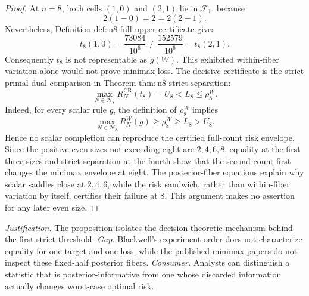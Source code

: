 \documentclass{article}
\begin{document}
\begin{proof}
At \(n=8\), both cells \((1,0)\) and \((2,1)\) lie in \(\mathcal F_1\), because
\[
 2(1-0)=2=2(2-1).
\]
Nevertheless, Definition
\(\mathrm{def{:}n8\mbox{-}full\mbox{-}upper\mbox{-}certificate}\)
gives
\[
 t_8(1,0)=\frac{73084}{10^6}
 \neq
 \frac{152579}{10^6}=t_8(2,1).
\]
Consequently \(t_8\) is not representable as \(g(W)\).  This exhibited within-fiber variation alone would not prove minimax loss.  The decisive certificate is the strict primal-dual comparison in Theorem
\(\mathrm{thm{:}n8\mbox{-}strict\mbox{-}separation}\):
\[
 \max_{N\in\mathcal N_8}R_N^{\mathrm{CR}}(t_8)
 =U_8<L_8\leq\rho_8^W.
\]
Indeed, for every scalar rule \(g\), the definition of \(\rho_8^W\) implies
\[
 \max_{N\in\mathcal N_8}R_N^W(g)
 \geq\rho_8^W
 \geq L_8
 >U_8.
\]
Hence no scalar completion can reproduce the certified full-count risk envelope.  Since the positive even sizes not exceeding eight are \(2,4,6,8\), equality at the first three sizes and strict separation at the fourth show that the second count first changes the minimax envelope at eight.  The posterior-fiber equations explain why scalar saddles close at \(2,4,6\), while the risk sandwich, rather than within-fiber variation by itself, certifies their failure at \(8\).  This argument makes no assertion for any later even size.
\end{proof}
\par\smallskip\noindent \textit{Justification.} The proposition isolates the decision-theoretic mechanism behind the first strict threshold. \textit{Gap.} Blackwell's experiment order does not characterize equality for one target and one loss, while the published minimax papers do not inspect these fixed-half posterior fibers. \textit{Consumer.} Analysts can distinguish a statistic that is posterior-informative from one whose discarded information actually changes worst-case optimal risk.
\end{document}
